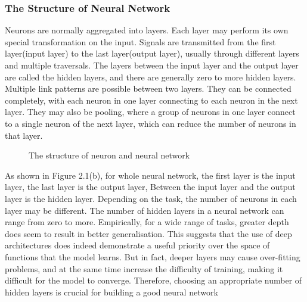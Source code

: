 \subsubsection{The Structure of Neural Network}
Neurons are normally aggregated into layers. Each layer may perform its own special transformation on the input. Signals are transmitted from the first layer(input layer) to the last layer(output layer), usually through different layers and multiple traversals.\cite{Wiki-ANN} The layers between the input layer and the output layer are called the hidden layers, and there are generally zero to more hidden layers. Multiple link patterns are possible between two layers. They can be connected completely, with each neuron in one layer connecting to each neuron in the next layer. They may also be pooling, where a group of neurons in one layer connect to a single neuron of the next layer, which can reduce the number of neurons in that layer.
\begin{figure}[H]
\centering  %
\caption{The structure of neuron and neural network}
\label{Fig.main}
\end{figure}
As shown in Figure 2.1(b), for whole neural network, the first layer is the input layer, the last layer is the output layer, Between the input layer and the output layer is the hidden layer. Depending on the task, the number of neurons in each layer may be different. The number of hidden layers in a neural network can range from zero to more. Empirically, for a wide range of tasks, greater depth does seem to result in better generalisation\cite{goodfellow2016deep}. This suggests that the use of deep architectures does indeed demonstrate a useful priority over the space of functions that the model learns. But in fact, deeper layers may cause over-fitting problems, and at the same time increase the difficulty of training, making it difficult for the model to converge. Therefore, choosing an appropriate number of hidden layers is crucial for building a good neural network
